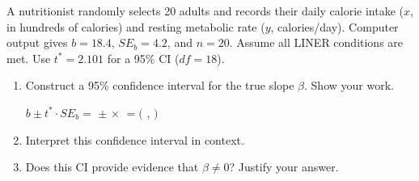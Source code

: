 \documentclass[10pt]{article}
\begin{document}
\namedateperiod

\vspace{0.1in}
A nutritionist randomly selects 20 adults and records their daily calorie intake ($x$,
in hundreds of calories) and resting metabolic rate ($y$, calories/day).
Computer output gives $b = 18.4$, $SE_b = 4.2$, and $n = 20$.
Assume all LINER conditions are met. Use $t^* = 2.101$ for a 95\% CI ($df = 18$).

\vspace{0.15in}
\begin{enumerate}

    \item Construct a 95\% confidence interval for the true slope $\beta$. Show your work.

          \vspace{0.05in}
          $b \pm t^* \cdot SE_b
          = $ \blank{2cm} $\pm$ \blank{2cm} $\times$ \blank{2cm}
          $= ($ \blank{3cm},\; \blank{3cm}$)$

          \vspace{0.1in}

    \item Interpret this confidence interval in context.


    \item Does this CI provide evidence that $\beta \ne 0$? Justify your answer.


\end{enumerate}
\end{document}
